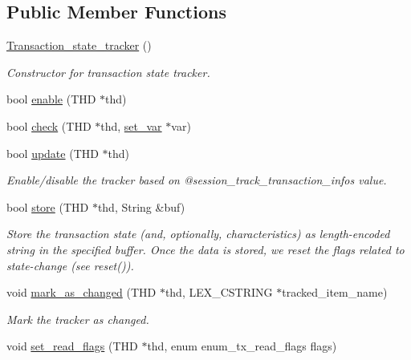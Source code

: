 \subsection*{Public Member Functions}
\begin{DoxyCompactItemize}
\item 
\mbox{\hyperlink{classTransaction__state__tracker_a121b121c5020591ab173dd5735e0c261}{Transaction\+\_\+state\+\_\+tracker}} ()
\begin{DoxyCompactList}\small\item\em Constructor for transaction state tracker. \end{DoxyCompactList}\item 
bool \mbox{\hyperlink{classTransaction__state__tracker_a1027295403af650734a45d8281cc5d1c}{enable}} (T\+HD $\ast$thd)
\item 
bool \mbox{\hyperlink{classTransaction__state__tracker_ab1c253155bc5bbab9edf22dc64fffa20}{check}} (T\+HD $\ast$thd, \mbox{\hyperlink{classset__var}{set\+\_\+var}} $\ast$var)
\item 
bool \mbox{\hyperlink{classTransaction__state__tracker_a96e814f8253741480125787405add62a}{update}} (T\+HD $\ast$thd)
\begin{DoxyCompactList}\small\item\em Enable/disable the tracker based on @session\+\_\+track\+\_\+transaction\+\_\+info\textquotesingle{}s value. \end{DoxyCompactList}\item 
bool \mbox{\hyperlink{classTransaction__state__tracker_a7f7843e53238fdc98ee31ac07b2376e2}{store}} (T\+HD $\ast$thd, String \&buf)
\begin{DoxyCompactList}\small\item\em Store the transaction state (and, optionally, characteristics) as length-\/encoded string in the specified buffer. Once the data is stored, we reset the flags related to state-\/change (see reset()). \end{DoxyCompactList}\item 
void \mbox{\hyperlink{classTransaction__state__tracker_a5afd4fcf4c13dcaf68811246a153d72f}{mark\+\_\+as\+\_\+changed}} (T\+HD $\ast$thd, L\+E\+X\+\_\+\+C\+S\+T\+R\+I\+NG $\ast$tracked\+\_\+item\+\_\+name)
\begin{DoxyCompactList}\small\item\em Mark the tracker as changed. \end{DoxyCompactList}\item 
void \mbox{\hyperlink{classTransaction__state__tracker_a89dd20a6792185119d322594f8c5a420}{set\+\_\+read\+\_\+flags}} (T\+HD $\ast$thd, enum enum\+\_\+tx\+\_\+read\+\_\+flags flags)

\end{DoxyCompactItemize}
